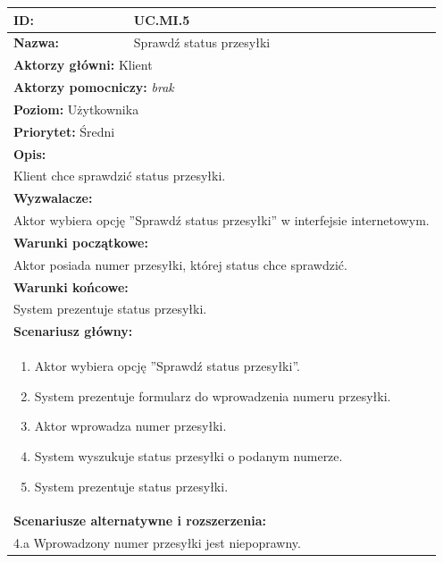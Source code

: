 \begin{center}
\begin{longtable}[h]{|p{1.6cm}|p{13.5cm}|}
\hline
\textbf{ID:} & UC.MI.5 \\ \hline
\textbf{Nazwa:} & Sprawdź status przesyłki \\ \hline
\multicolumn{2}{|p{15.1cm}|}{\textbf{Aktorzy główni:} Klient} \\
\multicolumn{2}{|p{15.1cm}|}{\textbf{Aktorzy pomocniczy:} 
\textit{brak}} \\
\multicolumn{2}{|p{15.1cm}|}{\textbf{Poziom:} Użytkownika} \\
\multicolumn{2}{|p{15.1cm}|}{\textbf{Priorytet:} Średni} \\
\hline
\multicolumn{2}{|p{15.1cm}|}{\textbf{Opis:}} \\
\multicolumn{2}{|p{15.1cm}|}{
Klient chce sprawdzić status przesyłki.
} \\ \hline
\multicolumn{2}{|p{15.1cm}|}{\textbf{Wyzwalacze:}} \\
\multicolumn{2}{|p{15.1cm}|}{
Aktor wybiera opcję ''Sprawdź status przesyłki'' w interfejsie internetowym.
} \\ \hline
\multicolumn{2}{|p{15.1cm}|}{\textbf{Warunki początkowe:}} \\
\multicolumn{2}{|p{15.1cm}|}{
Aktor posiada numer przesyłki, której status chce sprawdzić.
} \\ \hline
\multicolumn{2}{|p{15.1cm}|}{\textbf{Warunki końcowe:}} \\
\multicolumn{2}{|p{15.1cm}|}{
System prezentuje status przesyłki.
} \\ \hline
\multicolumn{2}{|p{15.1cm}|}{\textbf{Scenariusz główny:}} \\
\multicolumn{2}{|p{15.1cm}|}{
\begin{enumerate}
\item Aktor wybiera opcję ''Sprawdź status przesyłki''.
\item System prezentuje formularz do wprowadzenia numeru przesyłki.
\item Aktor wprowadza numer przesyłki.
\item System wyszukuje status przesyłki o podanym numerze.
\item System prezentuje status przesyłki.
\end{enumerate}
} \\ \hline
\multicolumn{2}{|p{15.1cm}|}{\textbf{Scenariusze alternatywne i rozszerzenia:}} \\
\multicolumn{2}{|p{15.1cm}|}{
4.a Wprowadzony numer przesyłki jest niepoprawny. \newline
}
\end{longtable}
\end{center}
